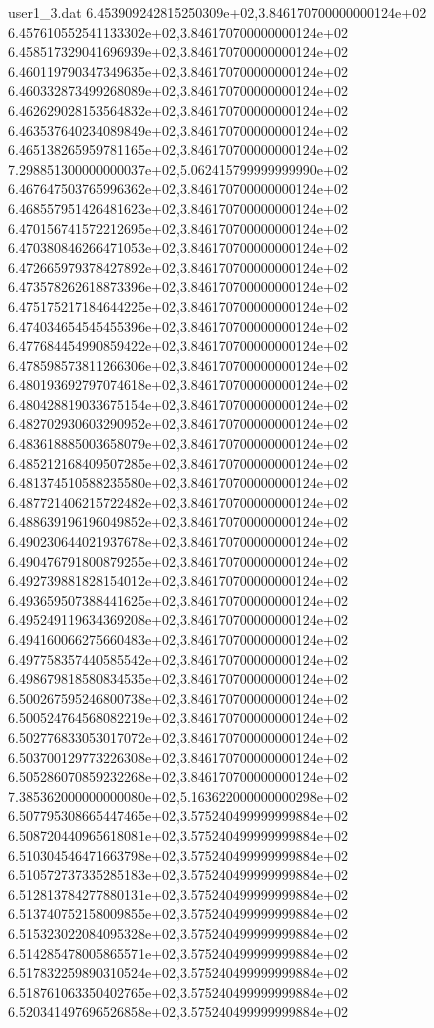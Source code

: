\begin{filecontents}{user1_3.dat}
6.453909242815250309e+02,3.846170700000000124e+02
6.457610552541133302e+02,3.846170700000000124e+02
6.458517329041696939e+02,3.846170700000000124e+02
6.460119790347349635e+02,3.846170700000000124e+02
6.460332873499268089e+02,3.846170700000000124e+02
6.462629028153564832e+02,3.846170700000000124e+02
6.463537640234089849e+02,3.846170700000000124e+02
6.465138265959781165e+02,3.846170700000000124e+02
7.298851300000000037e+02,5.062415799999999990e+02
6.467647503765996362e+02,3.846170700000000124e+02
6.468557951426481623e+02,3.846170700000000124e+02
6.470156741572212695e+02,3.846170700000000124e+02
6.470380846266471053e+02,3.846170700000000124e+02
6.472665979378427892e+02,3.846170700000000124e+02
6.473578262618873396e+02,3.846170700000000124e+02
6.475175217184644225e+02,3.846170700000000124e+02
6.474034654545455396e+02,3.846170700000000124e+02
6.477684454990859422e+02,3.846170700000000124e+02
6.478598573811266306e+02,3.846170700000000124e+02
6.480193692797074618e+02,3.846170700000000124e+02
6.480428819033675154e+02,3.846170700000000124e+02
6.482702930603290952e+02,3.846170700000000124e+02
6.483618885003658079e+02,3.846170700000000124e+02
6.485212168409507285e+02,3.846170700000000124e+02
6.481374510588235580e+02,3.846170700000000124e+02
6.487721406215722482e+02,3.846170700000000124e+02
6.488639196196049852e+02,3.846170700000000124e+02
6.490230644021937678e+02,3.846170700000000124e+02
6.490476791800879255e+02,3.846170700000000124e+02
6.492739881828154012e+02,3.846170700000000124e+02
6.493659507388441625e+02,3.846170700000000124e+02
6.495249119634369208e+02,3.846170700000000124e+02
6.494160066275660483e+02,3.846170700000000124e+02
6.497758357440585542e+02,3.846170700000000124e+02
6.498679818580834535e+02,3.846170700000000124e+02
6.500267595246800738e+02,3.846170700000000124e+02
6.500524764568082219e+02,3.846170700000000124e+02
6.502776833053017072e+02,3.846170700000000124e+02
6.503700129773226308e+02,3.846170700000000124e+02
6.505286070859232268e+02,3.846170700000000124e+02
7.385362000000000080e+02,5.163622000000000298e+02
6.507795308665447465e+02,3.575240499999999884e+02
6.508720440965618081e+02,3.575240499999999884e+02
6.510304546471663798e+02,3.575240499999999884e+02
6.510572737335285183e+02,3.575240499999999884e+02
6.512813784277880131e+02,3.575240499999999884e+02
6.513740752158009855e+02,3.575240499999999884e+02
6.515323022084095328e+02,3.575240499999999884e+02
6.514285478005865571e+02,3.575240499999999884e+02
6.517832259890310524e+02,3.575240499999999884e+02
6.518761063350402765e+02,3.575240499999999884e+02
6.520341497696526858e+02,3.575240499999999884e+02

\end{filecontents}
